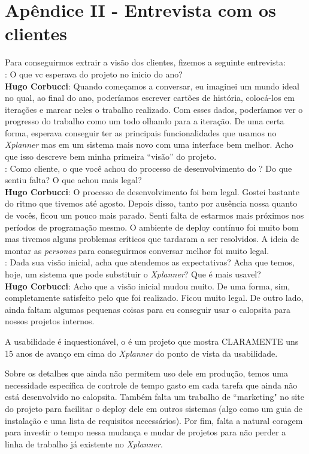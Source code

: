 \section{Apêndice II - Entrevista com os clientes}

Para conseguirmos extrair a visão dos clientes, fizemos a seguinte entrevista:\\

\textbf{\calopsita{}}: O que vc esperava do projeto no inicio do ano?\\

\textbf{Hugo Corbucci}: Quando começamos a conversar, eu imaginei um mundo ideal no qual, ao final do ano, poderíamos escrever cartões de história, colocá-los em iterações e marcar neles o trabalho realizado. Com esses dados, poderíamos ver o progresso do trabalho como um todo olhando para a iteração. De uma certa forma, esperava conseguir ter as principais funcionalidades que usamos no \textit{Xplanner} mas em um sistema mais novo com uma interface bem melhor. Acho que isso descreve bem minha primeira ``visão'' do projeto.\\

\textbf{\calopsita{}}: Como cliente, o que você achou do processo de desenvolvimento do \calopsita{}? Do que sentiu falta? O que achou mais legal?\\

\textbf{Hugo Corbucci}: O processo de desenvolvimento foi bem legal. Gostei bastante do ritmo que tivemos até agosto. Depois disso, tanto por ausência nossa quanto de vocês, ficou um pouco mais parado. Senti falta de estarmos mais próximos nos períodos de programação mesmo. O ambiente de deploy contínuo foi muito bom mas tivemos alguns problemas críticos que tardaram a ser resolvidos. A ideia de montar as \textit{personas} para conseguirmos conversar melhor foi muito legal.\\

\textbf{\calopsita{}}: Dada sua visão inicial, acha que atendemos as expectativas? Acha que temos, hoje, um sistema que pode substituir o \textit{Xplanner}? Que é mais usavel?\\

\textbf{Hugo Corbucci}: Acho que a visão inicial mudou muito. De uma forma, sim, completamente satisfeito pelo que foi realizado. Ficou muito legal. De outro lado, ainda faltam algumas pequenas coisas para eu conseguir usar o calopsita para nossos projetos internos.

A usabilidade é inquestionável, o \calopsita{} é um projeto que mostra CLARAMENTE uns 15 anos de avanço em cima do \textit{Xplanner} do ponto de vista da usabilidade.

Sobre os detalhes que ainda não permitem uso dele em produção, temos uma necessidade específica de controle de tempo gasto em cada tarefa que ainda não está desenvolvido no calopsita. Também falta um trabalho de ``marketing" no site do projeto para facilitar o deploy dele em outros sistemas (algo como um guia de instalação e uma lista de requisitos necessários). Por fim, falta a natural coragem para investir o tempo nessa mudança e mudar de projetos para não perder a linha de trabalho já existente no \textit{Xplanner}.